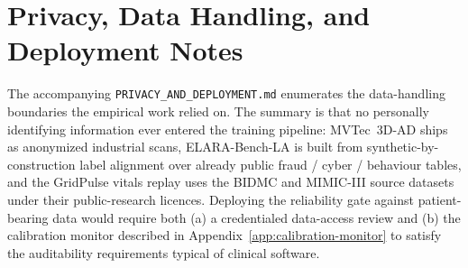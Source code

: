 \documentclass[11pt]{article}
\begin{document}
\section{Privacy, Data Handling, and Deployment Notes}
\label{app:privacy}

The accompanying \texttt{PRIVACY\_AND\_DEPLOYMENT.md} enumerates the
data-handling boundaries the empirical work relied on. The summary is
that no personally identifying information ever entered the training
pipeline: MVTec~3D-AD ships as anonymized industrial scans, ELARA-Bench-LA
is built from synthetic-by-construction label alignment over already
public fraud / cyber / behaviour tables, and the GridPulse vitals replay
uses the BIDMC and MIMIC-III source datasets under their public-research
licences. Deploying the reliability gate against patient-bearing data
would require both (a) a credentialed data-access review and (b) the
calibration monitor described in Appendix~\ref{app:calibration-monitor}
to satisfy the auditability requirements typical of clinical software.
\end{document}
